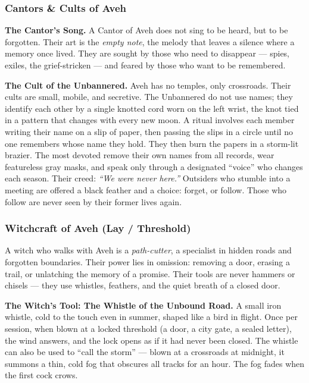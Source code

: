 \subsubsection*{Cantors \& Cults of Aveh}

\textbf{The Cantor's Song.} A Cantor of Aveh does not sing to be heard, but to be forgotten. Their art is the \textit{empty note}, the melody that leaves a silence where a memory once lived. They are sought by those who need to disappear --- spies, exiles, the grief-stricken --- and feared by those who want to be remembered.

\textbf{The Cult of the Unbannered.} Aveh has no temples, only crossroads. Their cults are small, mobile, and secretive. The Unbannered do not use names; they identify each other by a single knotted cord worn on the left wrist, the knot tied in a pattern that changes with every new moon. A ritual involves each member writing their name on a slip of paper, then passing the slips in a circle until no one remembers whose name they hold. They then burn the papers in a storm-lit brazier. The most devoted remove their own names from all records, wear featureless gray masks, and speak only through a designated ``voice'' who changes each season. Their creed: \textit{``We were never here.''} Outsiders who stumble into a meeting are offered a black feather and a choice: forget, or follow. Those who follow are never seen by their former lives again.

\subsubsection*{Witchcraft of Aveh (Lay / Threshold)}

A witch who walks with Aveh is a \textit{path-cutter}, a specialist in hidden roads and forgotten boundaries. Their power lies in omission: removing a door, erasing a trail, or unlatching the memory of a promise. Their tools are never hammers or chisels --- they use whistles, feathers, and the quiet breath of a closed door.

\textbf{The Witch's Tool: The Whistle of the Unbound Road.} A small iron whistle, cold to the touch even in summer, shaped like a bird in flight. Once per session, when blown at a locked threshold (a door, a city gate, a sealed letter), the wind answers, and the lock opens as if it had never been closed. The whistle can also be used to ``call the storm'' --- blown at a crossroads at midnight, it summons a thin, cold fog that obscures all tracks for an hour. The fog fades when the first cock crows.

